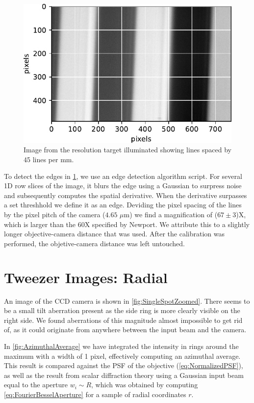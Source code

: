 \begin{figure}
    \centering
    \includegraphics[width = 0.42\linewidth]{figures/LineSpacingCalibration.pdf}
    \caption{Image from the resolution target illuminated showing lines spaced by 45 lines per mm.}
    \label{fig:resolutionTarget}
\end{figure}

To detect the edges in \cref{fig:resolutionTarget}, we use an edge detection algorithm script.
For several 1D row slices of the image, it blurs the edge using a Gaussian to surpress noise and subsequently computes the spatial derivative. 
When the derivative surpasses a set threshhold we define it as an edge.
Deviding the pixel spacing of the lines by the pixel pitch of the camera ($4.65$ $\mu$m) we find a magnification of ($67 \pm 3$)X, which is larger than the 60X specified by Newport. 
We attribute this to a slightly longer objective-camera distance that was used. 
After the calibration was performed, the objetive-camera distance was left untouched. 

\section{Tweezer Images: Radial}

An image of the CCD camera is shown in \cref{fig:SingleSpotZoomed}. 
There seems to be a small tilt aberration present as the side ring is more clearly visible on the right side. 
We found aberrations of this magnitude almost impossible to get rid of, as it could originate from anywhere between the input beam and the camera.

In \cref{fig:AzimuthalAverage} we have integrated the intensity in rings around the maximum with a width of 1 pixel, effectively computing an azimuthal average. 
This result is compared against the \ac{PSF} of the objective (\cref{eq:NormalizedPSF}), as well as the result from scalar diffraction theory using a Gaussian input beam equal to the aperture $w_i \sim R$, which was obtained by computing \cref{eq:FourierBesselAperture} for a sample of radial coordinates $r$. 

